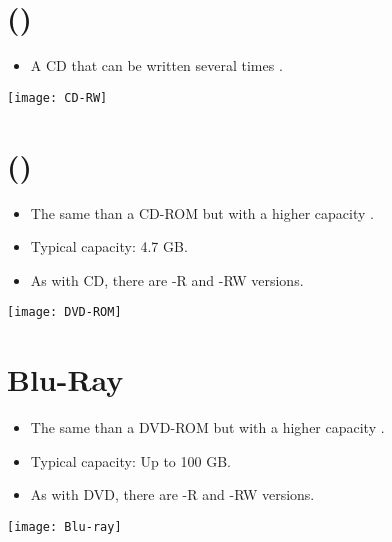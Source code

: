 \section{ ({)}}
\begin{itemize}
\item A \gls{CD} that can be written several times \cite{wikipedia_CD-RW}.
\end{itemize}
\vspace{-4ex}
\begin{center}
  \texttt{[image: CD-RW]}
\end{center}

\section{ ({)}}
\begin{itemize}
\item The same than a \gls{CD-ROM} but with a higher capacity
  \cite{wikipedia_DVD}.
\item Typical capacity: 4.7 GB.
\item As with \gls{CD}, there are -R and -RW versions.
\end{itemize}
\vspace{-4ex}
\begin{center}
  \texttt{[image: DVD-ROM]}
\end{center}

\section{Blu-Ray}
\begin{itemize}
\item The same than a \gls{DVD-ROM} but with a higher capacity
  \cite{BR}.
\item Typical capacity: Up to 100 GB.
\item As with \gls{DVD}, there are -R and -RW versions.
\end{itemize}
\vspace{-4ex}
\begin{center}
  \texttt{[image: Blu-ray]}
\end{center}

